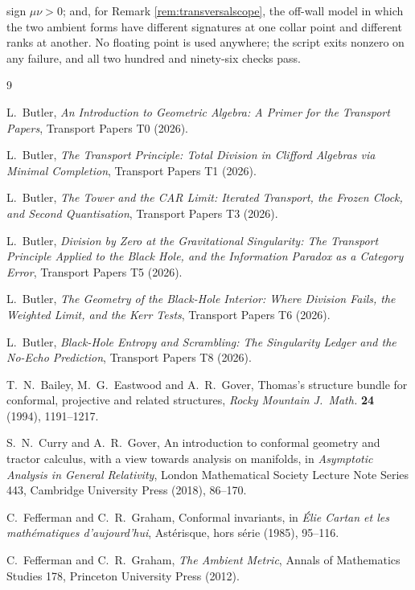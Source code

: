 \documentclass[11pt]{article}
\theoremstyle{definition}
\begin{document}
sign $\mu\nu > 0$; and, for Remark \ref{rem:transversalscope}, the off-wall model in which the two ambient forms have different signatures at one collar point and different ranks at another. No floating point is used anywhere; the script exits nonzero on any failure, and all two hundred and ninety-six checks pass.

\begin{thebibliography}{9}

L.~Butler,
\emph{An Introduction to Geometric Algebra: A Primer for the Transport Papers},
Transport Papers T0 (2026).

L.~Butler,
\emph{The Transport Principle: Total Division in Clifford Algebras via Minimal Completion},
Transport Papers T1 (2026).

L.~Butler,
\emph{The Tower and the CAR Limit: Iterated Transport, the Frozen Clock, and Second Quantisation},
Transport Papers T3 (2026).

L.~Butler,
\emph{Division by Zero at the Gravitational Singularity: The Transport Principle Applied to the Black Hole, and the Information Paradox as a Category Error},
Transport Papers T5 (2026).

L.~Butler,
\emph{The Geometry of the Black-Hole Interior: Where Division Fails, the Weighted Limit, and the Kerr Tests},
Transport Papers T6 (2026).

L.~Butler,
\emph{Black-Hole Entropy and Scrambling: The Singularity Ledger and the No-Echo Prediction},
Transport Papers T8 (2026).

T.~N.~Bailey, M.~G.~Eastwood and A.~R.~Gover,
Thomas's structure bundle for conformal, projective and related structures,
\emph{Rocky Mountain J.\ Math.} \textbf{24} (1994), 1191--1217.

S.~N.~Curry and A.~R.~Gover,
An introduction to conformal geometry and tractor calculus, with a view towards analysis on manifolds,
in \emph{Asymptotic Analysis in General Relativity},
London Mathematical Society Lecture Note Series 443, Cambridge University Press (2018), 86--170.

C.~Fefferman and C.~R.~Graham,
Conformal invariants,
in \emph{\'Elie Cartan et les math\'ematiques d'aujourd'hui},
Ast\'erisque, hors s\'erie (1985), 95--116.

C.~Fefferman and C.~R.~Graham,
\emph{The Ambient Metric},
Annals of Mathematics Studies 178, Princeton University Press (2012).


\end{thebibliography}
\end{document}
